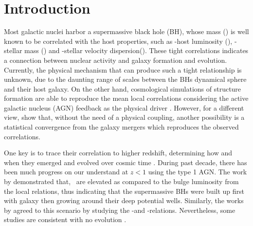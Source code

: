 \documentclass[apj]{emulateapj}
\begin{document}

\section{Introduction}
\label{sec:introduction}

Most galactic nuclei harbor a supermassive black hole (BH), whose mass (\mbh) is well known to be correlated with the host properties, such as \mbh-host luminosity (\lhost), \mbh-stellar mass (\smass) and \mbh-stellar velocity dispersion(\sigstar). These tight correlations indicates a connection between nuclear activity and galaxy formation and evolution\citep[e.g.,][]{Mag++98, F+M00, M+H03, Gul++09,Beifi2012, H+R04, Geb++01b, Gra++2011}.
Currently, the physical mechanism that can produce such a tight relationship is unknown, due to the daunting range of scales between the BHs dynamical sphere and their host galaxy. On the other hand, cosmological simulations of structure formation are able to reproduce the mean local correlations considering the active galactic nucleus (AGN) feedback as the physical driver \citep{Springel2005, Hopkins2008, Matteo2008, DeG++15}.
However, for a different view, \citet{Peng2007, Jahnke2011, Hirschmann2010} show that, without the need of a physical coupling, another possibility is a statistical convergence from the galaxy mergers which reproduces the observed correlations.

One key is to trace their correlation to higher redshift, determining how and when they emerged and evolved over cosmic time \citep[e.g.,][]{TMB04,Sal++06,Woo++06, Jah++09,SS13}. During past decade, there has been much progress on our understand at $z<1$ using the type 1 AGN. The work by \citet{Park15, Tre++07, Pen++06qsob} demonstrated that, \mbh\ are elevated as compared to the bulge luminosity from the local relations, thus indicating that the supermassive BHs were built up first with galaxy then growing around their deep potential wells. Similarly, the works by \citet{Bennert11, Woo++08} agreed to this scenario by studying the \mbh-\smass and \mbh-\sigstar relations. Nevertheless, some studies are consistent with no evolution \citet{SS13, Sun2015, Cisternas2011}.
\end{document}
